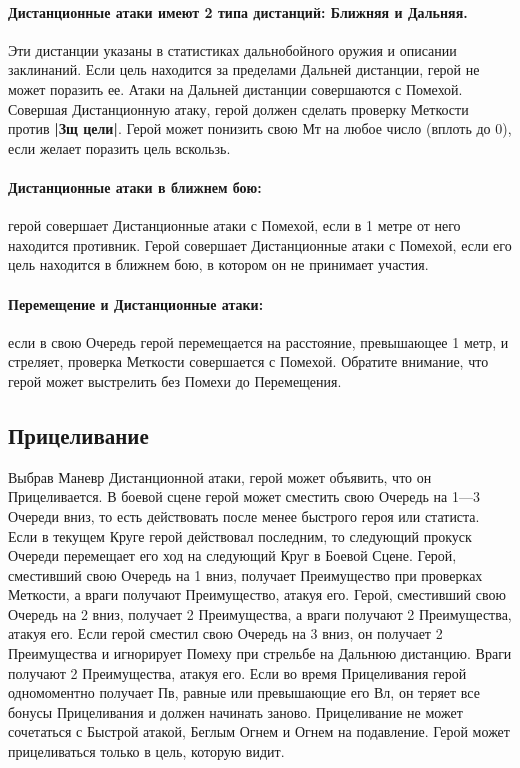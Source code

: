 \paragraph{Дистанционные атаки имеют 2 типа дистанций: Ближняя и Дальняя.} Эти дистанции указаны в статистиках дальнобойного оружия и описании заклинаний. Если цель находится за пределами Дальней дистанции, герой не может поразить ее. Атаки на Дальней дистанции совершаются с Помехой. Совершая Дистанционную атаку, герой должен сделать проверку Меткости против \textbf{|Зщ цели|}. Герой может понизить свою Мт на любое число (вплоть до 0), если желает поразить цель вскользь.
\paragraph{Дистанционные атаки в ближнем бою:} герой совершает Дистанционные атаки с Помехой, если в 1 метре от него находится противник. Герой совершает Дистанционные атаки с Помехой, если его цель находится в ближнем бою, в котором он не принимает участия.
\paragraph{Перемещение и Дистанционные атаки:} если в свою Очередь герой перемещается на расстояние, превышающее 1 метр, и стреляет, проверка Меткости совершается с Помехой. Обратите внимание, что герой может выстрелить без Помехи до Перемещения.
\subsection{Прицеливание}
Выбрав Маневр Дистанционной атаки, герой может объявить, что он Прицеливается. В боевой сцене герой может сместить свою Очередь на 1—3 Очереди вниз, то есть действовать после менее быстрого героя или статиста. Если в текущем Круге герой действовал последним, то следующий прокуск Очереди перемещает его ход на следующий Круг в Боевой Сцене. Герой, сместивший свою Очередь на 1 вниз, получает Преимущество при проверках Меткости, а враги получают Преимущество, атакуя его. Герой, сместивший свою Очередь на 2 вниз, получает 2 Преимущества, а враги получают 2 Преимущества, атакуя его. Если герой сместил свою Очередь на 3 вниз, он получает 2 Преимущества и игнорирует Помеху при стрельбе на Дальнюю дистанцию. Враги получают 2 Преимущества, атакуя его.
\newline
Если во время Прицеливания герой одномоментно получает Пв, равные или превышающие его Вл, он теряет все бонусы Прицеливания и должен начинать заново. Прицеливание не может сочетаться с Быстрой атакой, Беглым Огнем и Огнем на подавление. Герой может прицеливаться только в цель, которую видит.
